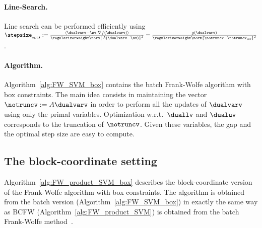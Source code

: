 \documentclass{article}
\begin{document}
\paragraph{Line-Search.} Line search can be performed efficiently using 
$\stepsize_{\text{\tiny opt}s} := \frac{\langle \dualvarv - \sv, \nabla f(\dualvarv) \rangle}{\regularizerweight\norm{A(\dualvarv-\sv)}^2}
= \frac{g(\dualvarv)}{\regularizerweight\norm{\notruncv-\notruncv_{\sv}}^2}$.

\paragraph{Algorithm.}
Algorithm~\ref{alg:FW_SVM_box} contains the batch Frank-Wolfe algorithm with box constraints.
The main idea consists in maintaining the vector $\notruncv := A\dualvarv$ in order to perform all the updates of $\dualvarv$ using only the primal variables.
Optimization w.r.t.\ $\duallv$ and $\dualuv$ corresponds to the truncation of $\notruncv$.
Given these variables, the gap and the optimal step size are easy to compute.

\subsection{The block-coordinate setting}
Algorithm~\ref{alg:FW_product_SVM_box} describes the block-coordinate version of the Frank-Wolfe algorithm with box constraints.
The algorithm is obtained from the batch version (Algorithm~\ref{alg:FW_SVM_box}) in exactly the same way as BCFW (Algorithm~\ref{alg:FW_product_SVM}) is obtained from the batch Frank-Wolfe method~\citep[Algorithm~2]{lacosteJulien13bcfw}.



%
%
%

%
%
%
%

%
%
\newlength{\citationLengthTable}
\end{document}
